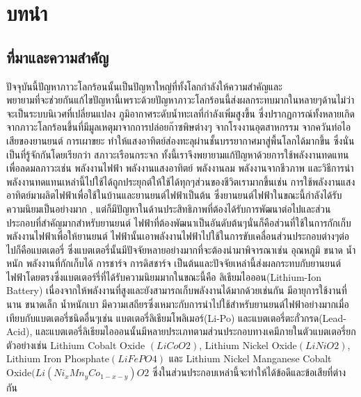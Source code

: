 \chapter{บทนำ}
\section{ที่มาและความสำคัญ}
	ปัจจุบันนี้ปัญหาภาวะโลกร้อนนั้นเป็นปัญหาใหญ่ที่ทั้งโลกกำลังให้ความสำคัญและ\\พยายามที่จะช่วยกันแก้ไขปัญหานี้เพราะด้วยปัญหาภาวะโลกร้อนนี้ส่งผลกระทบมากในหลายๆด้านไม่ว่าจะเป็นระบบนิเวศที่เปลี่ยนแปลง ภูมิอากาศระดับน้ำทะเลที่กำลังเพิ่มสูงขึ้น  ซี่งปรากฏการณ์ทั้งหลายเกิดจากภาวะโลกร้อนขึ้นที่มีมูลเหตุมาจากการปล่อยก๊าซพิษต่างๆ จากโรงงานอุตสาหกรรม จากควันท่อไอเสียของยานยนต์ การเผาขยะ ทำให้แสงอาทิตย์ส่องทะลุผ่านชั้นบรรยากาศมาสู่พื้นโลกได้มากขึ้น ซึ่งนั่นเป็นที่รู้จักกันโดยเรียกว่า สภาวะเรือนกระจก \cite{mitchell1989greenhouse} ทั้งนี้เราจึงพยายามแก้ปัญหาด้วยการใช้พลังงานทดแทนเพื่อลดมลภาวะเช่น พลังงานไฟฟ้า พลังงานแสงอาทิตย์ พลังงานลม พลังงานจากชีวภาพ และวิธีการนำพลังงานทดแทนเหล่านี้ไปใช้ได้ถูกประยุกต์ให้ใช้ได้ทุกๆส่วนของชีวิตเรามากขึ้นเช่น การใช้พลังงานแสงอาทิตย์มาผลิตไฟฟ้าเพื่อใช้ในบ้านและยานยนต์ไฟฟ้าเป็นต้น ซึ่งยานยนต์ไฟฟ้าในขณะนี้กำลังได้รับความนิยมเป็นอย่างมาก \cite{cazzola2016global},
	\cite{ding2022integrating} แต่ก็มีปัญหาในด้านประสิทธิภาพที่ต้องได้รับการพัฒนาต่อไปและส่วนประกอบที่สำคัญมากสำหรับยานยนต์ ไฟฟ้าที่ต้องพัฒนาเป็นอันดับต้นๆนั่นก็คือส่วนที่ใช้ในการกักเก็บพลังงานไฟฟ้าเพื่อให้ยานยนต์ ไฟฟ้านั้นเอาพลังงานไฟฟ้าไปใช้ในการขับเคลื่อนส่วนประกอบต่างๆต่อไปก็คือแบตเตอรี่ ซึ่งแบตเตอรี่นั้นมีปัจจัยหลายอย่างมากที่จะต้องนำมาพิจารณาเช่น อุณหภูมิ ขนาด น้ำหนัก พลังงานที่กักเก็บได้ การชาร์จ การดิสชาร์จ เป็นต้นและปัจจัยเหล่านี้ส่งผลกระทบกับยานยนต์ไฟฟ้าโดยตรงซึ่งแบตเตอร์รี่ที่ได้รับความนิยมมากในขณะนี้คือ ลิเธียมไอออน(Lithium-Ion Battery) เนื่องจากให้พลังงานที่สูงและยังสามารถเก็บพลังงานได้มากด้วยเช่นกัน มีอายุการใช้งานที่นาน ขนาดเล็ก น้ำหนักเบา มีความเสถียรซึ่งเหมาะกับการนำไปใช้สำหรับยานยนต์ไฟฟ้าอย่างมากเมื่อเทียบกับแบตเตอรี่ชนิดอื่นๆเช่น แบตเตอรี่ลิเธียมโพลิเมอร์(Li-Po) และแบตเตอรี่ตะกั่วกรด(Lead-Acid)\cite{miao2019current},\cite{wang2019reliability} และแบตเตอรี่ลิเธียมไอออนนั้นมีหลายประเภทตามส่วนประกอบทางเคมีภายในตัวแบตเตอรี่ยกตัวอย่างเช่น Lithium Cobalt Oxide
	$(LiCoO2)$, Lithium Nickel Oxide$(LiNiO2)$, Lithium Iron Phosphate$(LiFePO4)$ และ Lithium Nickel Manganese Cobalt Oxide$(Li(Ni_xMn_yCo_{1−x−y})O2$ ซึ่งในส่วนประกอบเหล่านี้จะทำให้ได้ข้อดีและข้อเสียที่ต่างกัน\cite{miao2019current}
\newline 
\hspace*{2cm}
